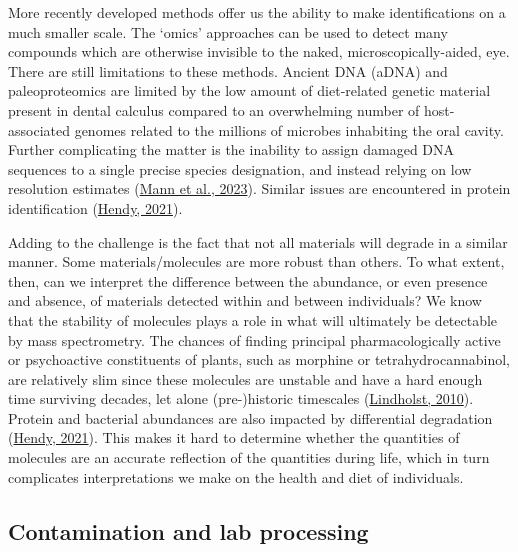 \documentclass[
  letterpaper,
]{book}
\begin{document}
More recently developed methods offer us the ability to make
identifications on a much smaller scale. The `omics' approaches can be
used to detect many compounds which are otherwise invisible to the
naked, microscopically-aided, eye. There are still limitations to these
methods. Ancient DNA (aDNA) and paleoproteomics are limited by the low
amount of diet-related genetic material present in dental calculus
compared to an overwhelming number of host-associated genomes related to
the millions of microbes inhabiting the oral cavity. Further
complicating the matter is the inability to assign damaged DNA sequences
to a single precise species designation, and instead relying on low
resolution estimates (\protect\hyperlink{ref-mannHaveSomething2023}{Mann
et al., 2023}). Similar issues are encountered in protein identification
(\protect\hyperlink{ref-hendyAncientProtein2021}{Hendy, 2021}).

Adding to the challenge is the fact that not all materials will degrade
in a similar manner. Some materials/molecules are more robust than
others. To what extent, then, can we interpret the difference between
the abundance, or even presence and absence, of materials detected
within and between individuals? We know that the stability of molecules
plays a role in what will ultimately be detectable by mass spectrometry.
The chances of finding principal pharmacologically active or
psychoactive constituents of plants, such as morphine or
tetrahydrocannabinol, are relatively slim since these molecules are
unstable and have a hard enough time surviving decades, let alone
(pre-)historic timescales
(\protect\hyperlink{ref-lindholstLongTerm2010}{Lindholst, 2010}).
Protein and bacterial abundances are also impacted by differential
degradation (\protect\hyperlink{ref-hendyAncientProtein2021}{Hendy,
2021}). This makes it hard to determine whether the quantities of
molecules are an accurate reflection of the quantities during life,
which in turn complicates interpretations we make on the health and diet
of individuals.

\hypertarget{contamination-and-lab-processing}{%
\subsection{Contamination and lab
processing}\label{contamination-and-lab-processing}}
\end{document}
